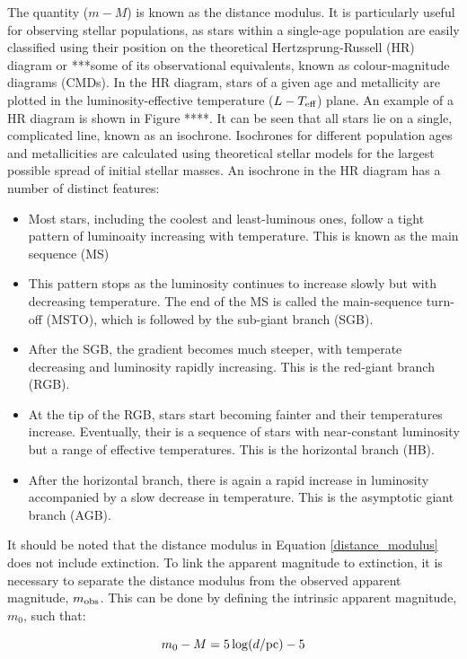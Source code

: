 \documentclass[12pt, a4paper]{report}
\begin{document}
The quantity ($m - M$) is known as the distance modulus. It is particularly useful for observing stellar populations, as stars within a single-age population are easily classified using their position on the theoretical Hertzsprung-Russell (HR) diagram or ***some of its observational equivalents, known as colour-magnitude diagrams (CMDs). In the HR diagram, stars of a given age and metallicity are plotted in the luminosity-effective temperature ($L-T_{\textnormal{eff}}$) plane. An example of a HR diagram is shown in Figure ****. It can be seen that all stars lie on a single, complicated line, known as an isochrone. Isochrones for different population ages and metallicities are calculated using theoretical stellar models for the largest possible spread of initial stellar masses. An isochrone in the HR diagram has a number of distinct features:
\begin{itemize}
\item Most stars, including the coolest and least-luminous ones, follow a tight pattern of luminoaity increasing with temperature. This is known as the main sequence (MS)
\item This pattern stops as the luminosity continues to increase slowly but with decreasing temperature. The end of the MS is called the main-sequence turn-off (MSTO), which is followed by the sub-giant branch (SGB).
\item After the SGB, the gradient becomes much steeper, with temperate decreasing and luminosity rapidly increasing. This is the red-giant branch (RGB).
\item At the tip of the RGB, stars start becoming fainter and their temperatures increase. Eventually, their is a sequence of stars with near-constant luminosity but a range of effective temperatures. This is the horizontal branch (HB).
\item After the horizontal branch, there is again a rapid increase in luminosity accompanied by a slow decrease in temperature. This is the asymptotic giant branch (AGB).
\end{itemize}

It should be noted that the distance modulus in Equation \ref{distance_modulus} does not include extinction. To link the apparent magnitude to extinction, it is necessary to separate the distance modulus from the observed apparent magnitude, $m_{\textnormal{obs}}$. This can be done by defining the intrinsic apparent magnitude, $m_{0}$, such that:

\begin{equation}
\label{intrinsic_app_mag}
m_{0} - M = 5\log(d/\textnormal{pc}) - 5
\end{equation}
\end{document}
